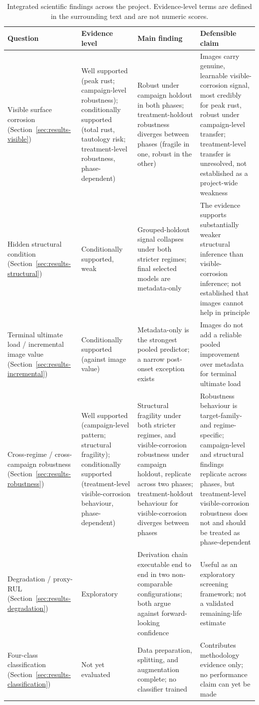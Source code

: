 \begin{table}[htbp]
\centering
\caption{Integrated scientific findings across the project. Evidence-level
terms are defined in the surrounding text and are not numeric scores.}
\label{tab:integrated-findings}
\footnotesize
\begin{tabular}{p{2.5cm}p{1.9cm}p{3.3cm}p{3.3cm}}
\toprule
Question & Evidence level & Main finding & Defensible claim \\
\midrule
Visible surface corrosion (Section~\ref{sec:results-visible}) & Well
supported (peak rust; campaign-level robustness); conditionally supported
(total rust, tautology risk; treatment-level robustness, phase-dependent)
& Robust under campaign holdout in both phases; treatment-holdout
robustness diverges between phases (fragile in one, robust in the other)
& Images carry genuine, learnable visible-corrosion signal, most credibly
for peak rust, robust under campaign-level transfer; treatment-level
transfer is unresolved, not established as a project-wide weakness \\
Hidden structural condition (Section~\ref{sec:results-structural}) &
Conditionally supported, weak & Grouped-holdout signal collapses under
both stricter regimes; final selected models are metadata-only & The
evidence supports substantially weaker structural inference than visible-
corrosion inference; not established that images cannot help in
principle \\
Terminal ultimate load / incremental image value
(Section~\ref{sec:results-incremental}) & Conditionally supported (against
image value) & Metadata-only is the strongest pooled predictor; a narrow
post-onset exception exists & Images do not add a reliable pooled
improvement over metadata for terminal ultimate load \\
Cross-regime / cross-campaign robustness (Section~\ref{sec:results-robustness})
& Well supported (campaign-level pattern; structural fragility);
conditionally supported (treatment-level visible-corrosion behaviour,
phase-dependent) & Structural fragility under both stricter regimes, and
visible-corrosion robustness under campaign holdout, replicate across two
phases; treatment-holdout behaviour for visible-corrosion diverges between
phases & Robustness behaviour is target-family- and regime-specific;
campaign-level and structural findings replicate across phases, but
treatment-level visible-corrosion robustness does not and should be
treated as phase-dependent \\
Degradation / proxy-RUL (Section~\ref{sec:results-degradation}) &
Exploratory & Derivation chain executable end to end in two non-comparable
configurations; both argue against forward-looking confidence & Useful as
an exploratory screening framework; not a validated remaining-life
estimate \\
Four-class classification (Section~\ref{sec:results-classification}) & Not
yet evaluated & Data preparation, splitting, and augmentation complete; no
classifier trained & Contributes methodology evidence only; no
performance claim can yet be made \\
\bottomrule
\end{tabular}
\end{table}

